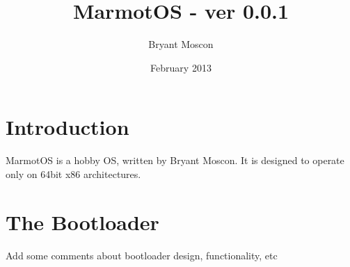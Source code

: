 \documentclass[a4paper,12pt]{article}
\begin{document}
\title{MarmotOS - ver 0.0.1}
\author{Bryant Moscon}
\date{February 2013}
\maketitle
\thispagestyle{fancy}
\noindent\hrulefill
\vspace{-5mm} %
\tableofcontents
\noindent\hrulefill

\clearpage

\section{Introduction}

MarmotOS is a hobby OS, written by Bryant Moscon. It is designed to operate only on 64bit x86 architectures. 


\section{The Bootloader}

Add some comments about bootloader design, functionality, etc
\end{document}
